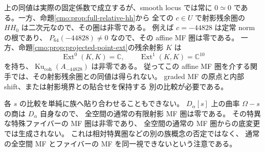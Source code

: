 \begin{remark}[射影残余圏を忘れる具体的な障害]
\label{cmo:rem:affine-mf-forgets-residual}
上の同値は実際の固定係数で成立するが、smooth locus では常に
$0\simeq0$ である。一方、命題\ref{cmo:prop:full-relative-hh}から
全ての $c\in U$ で射影残余圏の $HH_0$ は二次元なので、その圏は非零である。
例えば $c=-44828$ は定常 norm の根であり、
$P_{64}(-44828)\ne0$ なので、その affine MF 圏は零である。
一方、命題\ref{cmo:prop:projected-point-ext}の残余射影 $K$ は
\[
 \operatorname{Ext}^0(K,K)=\mathbb C,
 \qquad \operatorname{Ext}^1(K,K)=\mathbb C^{10}
\]
を持ち、$\operatorname{Ku}_{\mathrm{coh}}(A_{-44828})$ は非零である。
従ってこの affine MF 圏を介する関手では、その射影残余圏との同値は得られない。
graded MF の原点と内部 shift、または射影境界との貼合せを保持する
別の比較が必要である。

各 $s$ の比較を単純に族へ貼り合わせることもできない。
$D_\alpha[s]$ 上の曲率 $\Omega-s$ の商は $D_\alpha$ 自身なので、
全空間の通常の有限射影 MF 圏は零である。
その特異な特殊ファイバーの MF 圏は非零であり、
全空間の通常の MF 圏からの底変更では生成されない。
これは相対特異圏などの別の族概念の否定ではなく、
通常の全空間 MF とファイバーの MF を同一視できないという注意である。
\end{remark}
